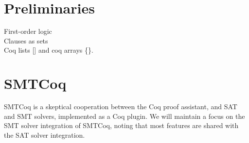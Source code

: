 \documentclass{article}
\begin{document}
\section{Preliminaries}
\label{sec:prelims}
	First-order logic\\
	Clauses as sets\\
	Coq lists [] and coq arrays \{\}.

\section{SMTCoq}
\label{sec:smtcoq}
	SMTCoq is a skeptical cooperation 
	between the Coq proof assistant, and 
	SAT and SMT solvers, implemented as a 
	Coq plugin. We will maintain a focus 
	on the SMT solver integration of 
	SMTCoq, noting that most features are 
	shared with the SAT	solver integration.
	
\end{document}
